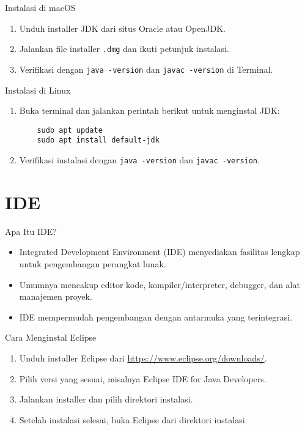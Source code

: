\documentclass[aspectratio=169, table]{beamer}
\begin{document}
\begin{frame}[fragile]{Instalasi di macOS}
\begin{enumerate}
\item Unduh installer JDK dari situs Oracle atau OpenJDK.
\item Jalankan file installer \texttt{.dmg} dan ikuti petunjuk instalasi.
\item Verifikasi dengan \texttt{java -version} dan \texttt{javac -version} di Terminal.
\end{enumerate}
\end{frame}

\begin{frame}[fragile]{Instalasi di Linux}
\begin{enumerate}
\item Buka terminal dan jalankan perintah berikut untuk menginstal JDK:
\begin{verbatim}
	sudo apt update
	sudo apt install default-jdk
\end{verbatim}
\item Verifikasi instalasi dengan \texttt{java -version} dan \texttt{javac -version}.
\end{enumerate}
\end{frame}

\section{IDE}
\begin{frame}[fragile]{Apa Itu IDE?}
\begin{itemize}
\item Integrated Development Environment (IDE) menyediakan fasilitas lengkap untuk pengembangan perangkat lunak.
\item Umumnya mencakup editor kode, kompiler/interpreter, debugger, dan alat manajemen proyek.
\item IDE mempermudah pengembangan dengan antarmuka yang terintegrasi.
\end{itemize}
\end{frame}

\begin{frame}[fragile]{Cara Menginstal Eclipse}
\begin{enumerate}
\item Unduh installer Eclipse dari \url{https://www.eclipse.org/downloads/}.
\item Pilih versi yang sesuai, misalnya Eclipse IDE for Java Developers.
\item Jalankan installer dan pilih direktori instalasi.
\item Setelah instalasi selesai, buka Eclipse dari direktori instalasi.
\end{enumerate}
\end{frame}
\end{document}
